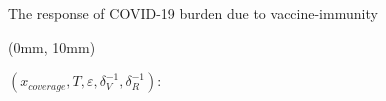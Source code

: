 \begin{frame}{The response of COVID-19 burden due to vaccine-immunity}
    \begin{textblock*}{127mm}(0mm, 10mm) 
        \begin{block}{%
            $
                (x_{coverage},
                T, \varepsilon,\delta_{V}^{-1}, \delta_{R}^{-1}):
            $%
        }
        \end{block}
    \end{textblock*}
\end{frame}